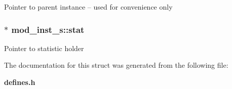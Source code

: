 Pointer to parent instance -- used for convenience only 
\subsubsection{$\ast$ mod\_\-inst\_\-s::stat}\label{structmod__inst__s_m2}


Pointer to statistic holder 

The documentation for this struct was generated from the following file:\begin{CompactItemize}
\item 
{\bf defines.h}\end{CompactItemize}

